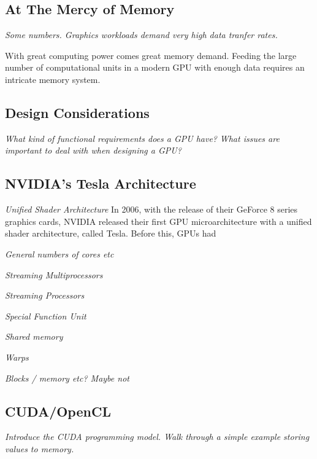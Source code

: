 \documentclass[../main/report.tex]{subfiles}
\begin{document}
\subsection{At The Mercy of Memory}


\textit{Some numbers. Graphics workloads demand very high data tranfer rates.}

With great computing power comes great memory demand.
Feeding the large number of computational units in a modern GPU with enough data requires an intricate memory system.


\subsection{Design Considerations}

\textit{What kind of functional requirements does a GPU have?}
\textit{What issues are important to deal with when designing a GPU?}

\subsection{NVIDIA's Tesla Architecture} %


\emph{Unified Shader Architecture}
In 2006, with the release of their GeForce 8 series graphics cards, NVIDIA released their first GPU microarchitecture with a unified shader architecture, called Tesla. Before this, GPUs had 

\emph{General numbers of cores etc}

\emph{Streaming Multiprocessors}

\emph{Streaming Processors}

\emph{Special Function Unit}

\emph{Shared memory}

\emph{Warps}

\emph{Blocks / memory etc? Maybe not}



\subsection{CUDA/OpenCL}
\emph{Introduce the CUDA programming model. Walk through a simple example storing values to memory.}
\end{document}
